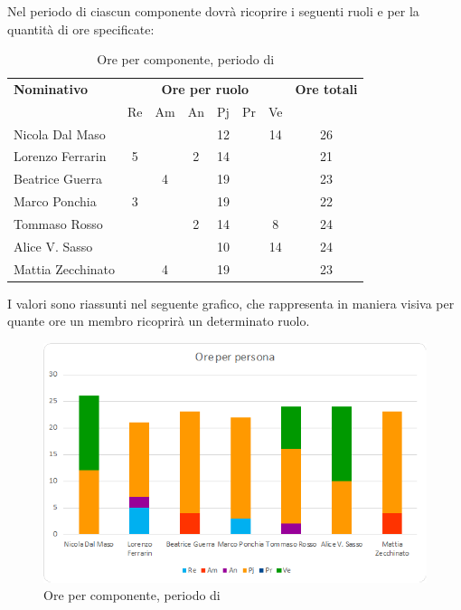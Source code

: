 \subsubsection{\PD}
Nel periodo di \PD{} ciascun componente dovrà ricoprire i seguenti ruoli e per la quantità di ore specificate:

\begin{table}[H]
	\centering
	\begin{tabular}{|l|c|c|c|c|c|c|c|}
		\hline
		\textbf{Nominativo} & 
		\multicolumn{6}{c|}{\textbf{Ore per ruolo}} & 
		\textbf{Ore totali} \\
		& Re & Am & An & Pj & Pr & Ve & \\
		\hline
		Nicola Dal Maso & & & &12 & &14 & 26 \\
		Lorenzo Ferrarin &5 & &2 &14 & & & 21 \\
		Beatrice Guerra & &4 & &19 & & & 23 \\
		Marco Ponchia &3 & & &19 & & & 22 \\
		Tommaso Rosso & & &2 &14 & &8 & 24 \\
		Alice V. Sasso & & & &10 & &14 & 24 \\
		Mattia Zecchinato & &4 & &19 & & & 23 \\
		\hline
	\end{tabular}
	\caption{Ore per componente, periodo di \PD{}}
\end{table}
I valori sono riassunti nel seguente grafico, che rappresenta in maniera visiva per quante ore un membro ricoprirà un determinato ruolo.
\begin{figure}[H]
	\centering
	\includegraphics[width=14cm]{img_suddlavoro/PD2.png}
	\caption{Ore per componente, periodo di \PD{}}
\end{figure}

